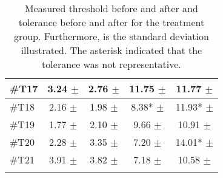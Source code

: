 \begin{longtable} {l|c|c|c|c}
\#T17 & 3.24 $\pm$  & 2.76 $\pm$   & 11.75 $\pm$  & 11.77 $\pm$  \\ \hline
\#T18 & 2.16 $\pm$  & 1.98  $\pm$ & 8.38* $\pm$  & 11.93* $\pm$  \\ \hline
\#T19 & 1.77 $\pm$  & 2.10 $\pm$  & 9.66 $\pm$  & 10.91  $\pm$  \\ \hline
\#T20 & 2.28 $\pm$  & 3.35 $\pm$  & 7.20 $\pm$  & 14.01* $\pm$  \\ \hline
\#T21 & 3.91 $\pm$  &  3.82 $\pm$  & 7.18 $\pm$  & 10.58 $\pm$  \\ \hline
	\caption{Measured threshold before and after and tolerance before and after for the treatment group. Furthermore, is the standard deviation illustrated. The asterisk indicated that the tolerance was not representative.}
	\label{tab:TreatmentA}
\end{longtable}
\vspace{-.5cm}

